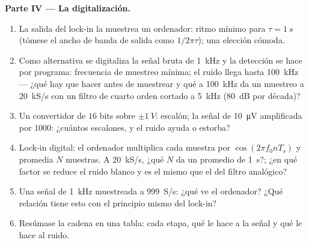 \begin{problem}
\medskip
\noindent\textbf{Parte IV --- La digitalización.}
\begin{enumerate}[resume]
  \item La salida del lock-in la muestrea un ordenador: ritmo mínimo para
        $\tau = \qty{1}{s}$ (tómese el ancho de banda de salida como
        $1/2\pi\tau$); una elección cómoda.
  \item Como alternativa se digitaliza la señal bruta de \qty{1}{kHz} y la
        detección se hace por programa: frecuencia de muestreo mínima; el
        ruido llega hasta \qty{100}{kHz} --- ¿qué hay que hacer antes de
        muestrear y qué  a \qty{100}{kHz} da un muestreo a
        \qty{20}{kS/s} con un filtro de cuarto orden cortado a \qty{5}{kHz}
        (\qty{80}{dB} por década)?
  \item Un convertidor de $16$ bits sobre $\pm\qty{1}{V}$: escalón; la
        señal de \qty{10}{\micro V} amplificada por $1000$: ¿cuántos
        escalones, y el ruido ayuda o estorba?
  \item Lock-in digital: el ordenador multiplica cada muestra por
        $\cos(2\pi f_0nT_s)$ y promedia $N$ muestras. A \qty{20}{kS/s},
        ¿qué $N$ da un promedio de \qty{1}{s}?; ¿en qué factor se reduce
        el ruido blanco y es el mismo que el del filtro analógico?
  \item Una señal de \qty{1}{kHz} muestreada a \qty{999}{S/s}: ¿qué ve el
        ordenador? ¿Qué relación tiene esto con el principio mismo del
        lock-in?
  \item Resúmase la cadena en una tabla: cada etapa, qué le hace a la
        señal y qué le hace al ruido.
\end{enumerate}
\end{problem}
